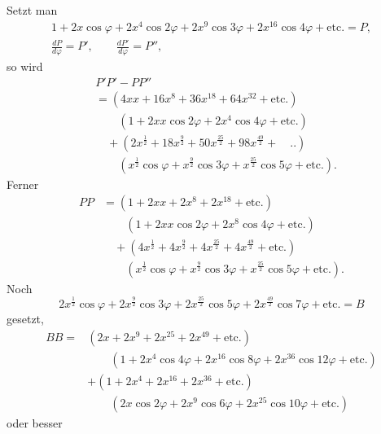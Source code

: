 \begingroup
\newcommand{\IndexSurd}[1]{{}^{#1}\!\surd}
\clearpage{}\NoSourceHead
{}
\par\indent Setzt man
\[\begin{gathered}
1+2x\cos\varphi+2x^4\cos2\varphi+2x^9\cos3\varphi+2x^{16}\cos4\varphi+\text{etc.}=P,\\[5pt]
\frac{dP}{d\varphi}=P',\qquad\frac{dP'}{d\varphi}=P'',
\end{gathered}\]
\noindent so wird
\[\begin{aligned}
&P'P'-PP''\\
&=(4xx+16x^8+36x^{18}+64x^{32}+\text{etc.})\\
&\qquad(1+2xx\cos2\varphi+2x^4\cos4\varphi+\text{etc.})\\
&\quad+(2x^{\frac12}+18x^{\frac92}+50x^{\frac{25}2}+98x^{\frac{49}2}+\quad{.}{.})\\
&\qquad(x^{\frac12}\cos\varphi+x^{\frac92}\cos3\varphi+x^{\frac{25}2}\cos5\varphi+\text{etc.}).
\end{aligned}\]
\noindent Ferner
\[\begin{aligned}
PP&=(1+2xx+2x^8+2x^{18}+\text{etc.})\\
&\qquad(1+2xx\cos2\varphi+2x^8\cos4\varphi+\text{etc.})\\
&\quad+(4x^{\frac12}+4x^{\frac92}+4x^{\frac{25}2}+4x^{\frac{49}2}+\text{etc.})\\
&\qquad(x^{\frac12}\cos\varphi+x^{\frac92}\cos3\varphi+x^{\frac{25}2}\cos5\varphi+\text{etc.}).
\end{aligned}\]
\noindent Noch
\[
2x^{\frac12}\cos\varphi+2x^{\frac92}\cos3\varphi+2x^{\frac{25}2}\cos5\varphi+2x^{\frac{49}2}\cos7\varphi+\text{etc.}=B
\]
\noindent gesetzt,
\[\begin{aligned}
BB={}&(2x+2x^9+2x^{25}+2x^{49}+\text{etc.})\\
&\qquad(1+2x^4\cos4\varphi+2x^{16}\cos8\varphi+2x^{36}\cos12\varphi+\text{etc.})\\
&+(1+2x^4+2x^{16}+2x^{36}+\text{etc.})\\
&\qquad(2x\cos2\varphi+2x^9\cos6\varphi+2x^{25}\cos10\varphi+\text{etc.})
\end{aligned}\]
\clearpage{}
\noindent oder besser
